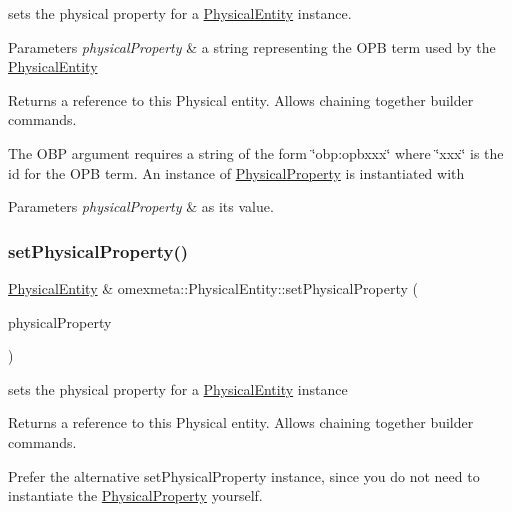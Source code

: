 sets the physical property for a \hyperlink{classomexmeta_1_1PhysicalEntity}{Physical\+Entity} instance. 


\begin{DoxyParams}{Parameters}
{\em physical\+Property} & a string representing the O\+PB term used by the \hyperlink{classomexmeta_1_1PhysicalEntity}{Physical\+Entity} \\
\hline
\end{DoxyParams}
\begin{DoxyReturn}{Returns}
a reference to this Physical entity. Allows chaining together builder commands.
\end{DoxyReturn}
The O\+BP argument requires a string of the form \char`\"{}obp\+:opbxxx\char`\"{} where \char`\"{}xxx\char`\"{} is the id for the O\+PB term. An instance of \hyperlink{classomexmeta_1_1PhysicalProperty}{Physical\+Property} is instantiated with 
\begin{DoxyParams}{Parameters}
{\em physical\+Property} & as its value. \\
\hline
\end{DoxyParams}
\mbox{\label{classomexmeta_1_1PhysicalEntity_a9bca0cb13601b6f9617df9f264968f1f}} 
\subsubsection{\texorpdfstring{set\+Physical\+Property()}{setPhysicalProperty()}\hspace{0.1cm}{\footnotesize\ttfamily [2/2]}}
{\footnotesize\ttfamily \hyperlink{classomexmeta_1_1PhysicalEntity}{Physical\+Entity} \& omexmeta\+::\+Physical\+Entity\+::set\+Physical\+Property (\begin{DoxyParamCaption}\item[{\hyperlink{classomexmeta_1_1PhysicalProperty}{Physical\+Property}}]{physical\+Property }\end{DoxyParamCaption})}



sets the physical property for a \hyperlink{classomexmeta_1_1PhysicalEntity}{Physical\+Entity} instance 

\begin{DoxyReturn}{Returns}
a reference to this Physical entity. Allows chaining together builder commands.
\end{DoxyReturn}
Prefer the alternative set\+Physical\+Property instance, since you do not need to instantiate the \hyperlink{classomexmeta_1_1PhysicalProperty}{Physical\+Property} yourself.

